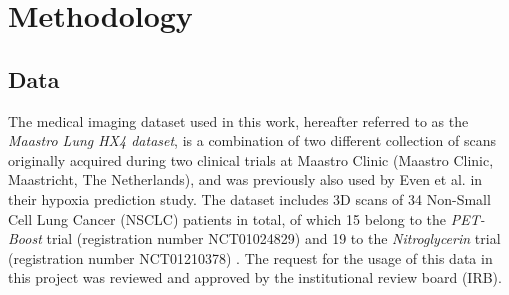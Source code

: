 \chapter{Methodology}
\label{Methodology}



\section{Data}
The medical imaging dataset used in this work, hereafter referred to as the \textit{Maastro Lung HX4 dataset}, is a combination of two different collection of scans originally acquired during two clinical trials at Maastro Clinic (Maastro Clinic, Maastricht, The Netherlands), and was previously also used by Even et al. \cite{even2017predicting} in their hypoxia prediction study. The dataset includes 3D scans of 34 Non-Small Cell Lung Cancer (NSCLC) patients in total, of which 15 belong to the \textit{PET-Boost} trial (registration number NCT01024829) \cite{van2012pet} and 19 to the \textit{Nitroglycerin} trial (registration number NCT01210378) \cite{even2017predicting}. The request for the usage of this data in this project was reviewed and approved by the institutional review board (IRB).


